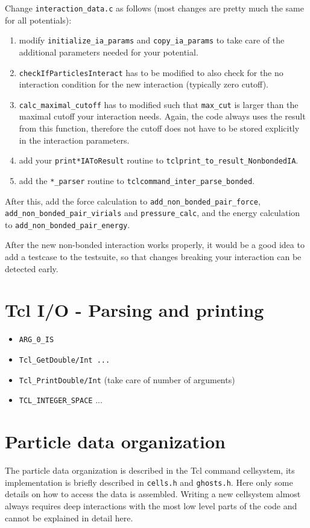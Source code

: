 \documentclass[
a4paper,                        %
11pt,                           %
twoside,                        %
footsepline,                    %
headsepline,                    %
headexclude,                    %
footexclude,                    %
pagesize,                       %
bibtotocnumbered,               %
idxtotoc                        %
]{scrreprt}
\begin{document}
Change \verb!interaction_data.c! as follows (most changes are pretty
much the same for all potentials):
\begin{enumerate}
\item modify \verb!initialize_ia_params! and \verb!copy_ia_params! to
  take care of the additional parameters needed for your potential.
\item \verb!checkIfParticlesInteract! has to be modified to also check
  for the no interaction condition for the new interaction (typically
  zero cutoff).
\item \verb!calc_maximal_cutoff! has to modified such that
  \verb!max_cut! is larger than the maximal cutoff your interaction
  needs. Again, the code always uses the result from this function,
  therefore the cutoff does not have to be stored explicitly in the
  interaction parameters.
\item add your \verb!print*IAToResult! routine to
  \verb!tclprint_to_result_NonbondedIA!.
\item add the \verb!*_parser! routine to
  \verb!tclcommand_inter_parse_bonded!.
\end{enumerate}

After this, add the force calculation to
\verb!add_non_bonded_pair_force!, \verb!add_non_bonded_pair_virials!
and \verb!pressure_calc!, and the energy calculation to
\verb!add_non_bonded_pair_energy!.

After the new non-bonded interaction works properly, it would be a
good idea to add a testcase to the testsuite, so that changes breaking
your interaction can be detected early.

\section{Tcl I/O - Parsing and printing}
\begin{itemize}
\item \verb!ARG_0_IS!
\item \verb!Tcl_GetDouble/Int ...!
\item \verb!Tcl_PrintDouble/Int! (take care of number of arguments)
\item \verb!TCL_INTEGER_SPACE! ...
\end{itemize}

\section{Particle data organization}

The particle data organization is described in the Tcl command
cellsystem, its implementation is briefly described in
\texttt{cells.h} and \texttt{ghosts.h}. Here only some details on how
to access the data is assembled. Writing a new cellsystem almost
always requires deep interactions with the most low level parts of the
code and cannot be explained in detail here.
\end{document}
